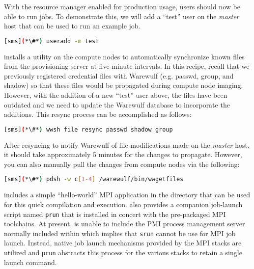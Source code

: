With the resource manager enabled for production usage, users should now be
able to run jobs. To demonstrate this, we will add a ``test'' user on the {\em master}
host that can be used to run an example job.

\begin{lstlisting}[language=bash,keywords={}]
[sms](*\#*) useradd -m test
\end{lstlisting}

\Warewulf{} installs a utility on the compute nodes to automatically 
synchronize known files from the provisioning server at five minute intervals. In this
recipe, recall that we previously registered credential files with Warewulf (e.g. passwd,
group, and shadow) so that these files would be propagated during compute node
imaging. However, with the addition of a new ``test'' user above, the files
have been outdated and we need to update the Warewulf database to incorporate
the additions. This resync process can be accomplished as follows:

\begin{lstlisting}[language=bash,keywords={}]
[sms](*\#*) wwsh file resync passwd shadow group
\end{lstlisting}

\begin{center}
\begin{tcolorbox}[]
\small
After resyncing to notify Warewulf of file modifications made on the {\em
master} host, it should take approximately 5 minutes for the changes to
propagate. However, you can also manually pull the changes from compute nodes
via the following:
\begin{lstlisting}[language=bash,keywords={}]
[sms](*\#*) pdsh -w c[1-4] /warewulf/bin/wwgetfiles 
\end{lstlisting}
\end{tcolorbox}
\end{center}


\OHPC{} includes a simple ``hello-world'' MPI application in the
 directory that can be used for this quick
compilation and execution. \OHPC{} also provides a companion job-launch script
named \texttt{prun} that is installed in concert with the pre-packaged MPI
toolchains. At present, \OHPC{} is unable to include the PMI process management
server normally included within \SLURM{} which implies that \texttt{srun} cannot
be use for MPI job launch. Instead, native job launch mechanisms provided by
the MPI stacks are utilized and \texttt{prun} abstracts this process for the
various stacks to retain a single launch command.


